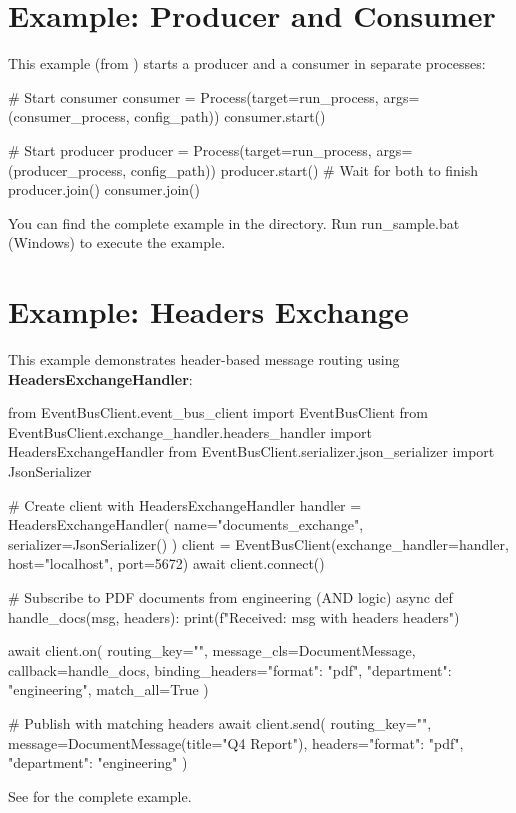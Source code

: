 \newpage
\section{Example: Producer and Consumer}
This example (from ) starts a producer and a consumer in separate processes:
\begin{pythoncode}
# Start consumer
consumer = Process(target=run_process, args=(consumer_process, config_path))
consumer.start()

# Start producer
producer = Process(target=run_process, args=(producer_process, config_path))
producer.start()
# Wait for both to finish
producer.join()
consumer.join()
\end{pythoncode}

You can find the complete example in the  directory. Run run\_sample.bat (Windows) to execute the example.

\section{Example: Headers Exchange}
This example demonstrates header-based message routing using \textbf{HeadersExchangeHandler}:
\begin{pythoncode}
from EventBusClient.event_bus_client import EventBusClient
from EventBusClient.exchange_handler.headers_handler import HeadersExchangeHandler
from EventBusClient.serializer.json_serializer import JsonSerializer

# Create client with HeadersExchangeHandler
handler = HeadersExchangeHandler(
    name="documents_exchange",
    serializer=JsonSerializer()
)
client = EventBusClient(exchange_handler=handler, host="localhost", port=5672)
await client.connect()

# Subscribe to PDF documents from engineering (AND logic)
async def handle_docs(msg, headers):
    print(f"Received: {msg} with headers {headers}")

await client.on(
    routing_key="",
    message_cls=DocumentMessage,
    callback=handle_docs,
    binding_headers={"format": "pdf", "department": "engineering"},
    match_all=True
)

# Publish with matching headers
await client.send(
    routing_key="",
    message=DocumentMessage(title="Q4 Report"),
    headers={"format": "pdf", "department": "engineering"}
)
\end{pythoncode}

See  for the complete example.

